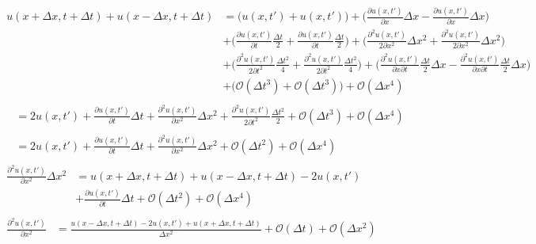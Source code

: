 \documentclass{article}
\begin{document}
\begin{subequations}
	\begin{align}
		\begin{split}
		u(x+\Delta x, t+\Delta t) + u(x-\Delta x,t + \Delta t) &= 
		\Big(u(x,t') + u(x,t') \Big) + \Big(\frac{\partial u(x,t')}{\partial x}\Delta x-\frac{\partial u(x,t')}{\partial x}\Delta x\Big)\\ 
		&+ \Big(\frac{\partial u(x,t')}{\partial t} \frac{\Delta t}{2} +\frac{\partial u(x,t')}{\partial t} \frac{\Delta t}{2} \Big) + \Big(\frac{\partial^2 u(x,t')}{2\partial x^2}\Delta x^2+\frac{\partial^2 u(x,t')}{2\partial x^2}\Delta x^2\Big)\\
		& + \Big(\frac{\partial^2 u(x,t')}{2\partial t^2}\frac{\Delta t^2}{4} +\frac{\partial^2 u(x,t')}{2\partial t^2}\frac{\Delta t^2}{4} \Big) + \Big(\frac{\partial^2 u(x,t')}{\partial x\partial t}\frac{\Delta t}{2} \Delta x - \frac{\partial^2 u(x,t')}{\partial x\partial t}\frac{\Delta t}{2} \Delta x\Big)\\
		& + \Big(\mathcal{O}(\Delta t^3) + \mathcal{O}(\Delta t^3) \Big) + \mathcal{O}(\Delta x^4)
		\end{split}\\
		\begin{split}
			&=2u(x,t') + \frac{\partial u(x,t')}{\partial t} \Delta t
			+ \frac{\partial^2 u(x,t')}{\partial x^2}\Delta x^2
			 + \frac{\partial^2 u(x,t')}{2\partial t^2}\frac{\Delta t^2}{2}  
			 + \mathcal{O}(\Delta t^3) + \mathcal{O}(\Delta x^4)
		\end{split}\\
		\begin{split}
			&=2u(x,t') + \frac{\partial u(x,t')}{\partial t} \Delta t
			+ \frac{\partial^2 u(x,t')}{\partial x^2}\Delta x^2			
			+ \mathcal{O}(\Delta t^2) + \mathcal{O}(\Delta x^4)
		\end{split}\\	
		\begin{split}
		\frac{\partial^2 u(x,t')}{\partial x^2}\Delta x^2
		& = 
		u(x+\Delta x, t+\Delta t) + u(x-\Delta x,t + \Delta t) 
		- 2u(x,t') 
			\\ 
		&+\frac{\partial u(x,t')}{\partial t} \Delta t
		+  \mathcal{O}(\Delta t^2) + \mathcal{O}(\Delta x^4)
		\end{split}\\
		\begin{split}
			\frac{\partial^2 u(x,t')}{\partial x^2}
			&=\frac{u(x-\Delta x,t+ \Delta t)  - 2u(x,t') +  	u(x+\Delta x, t+\Delta t)}{\Delta x^2} +  \mathcal{O}(\Delta t) + \mathcal{O}(\Delta x^2)\label{eq:cnX2}
		\end{split}		
	\end{align}
\end{subequations}
\end{document}
